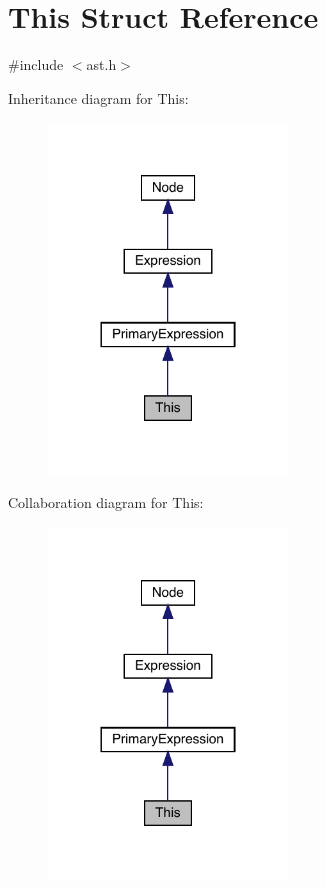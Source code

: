 \hypertarget{struct_this}{}\section{This Struct Reference}
\label{struct_this}


{\ttfamily \#include $<$ast.\+h$>$}



Inheritance diagram for This\+:\nopagebreak
\begin{figure}[H]
\begin{center}
\leavevmode
\includegraphics[width=180pt]{struct_this__inherit__graph}
\end{center}
\end{figure}


Collaboration diagram for This\+:\nopagebreak
\begin{figure}[H]
\begin{center}
\leavevmode
\includegraphics[width=180pt]{struct_this__coll__graph}
\end{center}
\end{figure}
